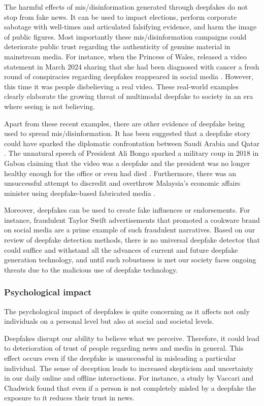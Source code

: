 The harmful effects of mis/disinformation generated through deepfakes do not stop from fake news. It can be used to impact elections, perform corporate sabotage with well-times and articulated falsifying evidence, and harm the image of public figures. Most importantly these mis/disinformation campaigns could deteriorate public trust regarding the authenticity of genuine material in mainstream media. For instance, when the Princess of Wales, released a video statement in March 2024 sharing that she had been diagnosed with cancer a fresh round of conspiracies regarding deepfakes reappeared in social media \cite{deepfakewashingtonpost}. However, this time it was people disbelieving a real video. These real-world examples clearly elaborate the growing threat of multimodal deepfake to society in an era where seeing is not believing.

Apart from these recent examples, there are other evidence of deepfake being used to spread mis/disinformation. It has been suggested that a deepfake story could have sparked the diplomatic confrontation between Saudi Arabia and Qatar \cite{deepfakebrookings1}. The unnatural speech of President Ali Bongo sparked a military coup in 2018 in Gabon claiming that the video was a deepfake and the president was no longer healthy enough for the office or even had died \cite{deepfakeforbes}. Furthermore, there was an unsuccessful attempt to discredit and overthrow Malaysia’s economic affairs minister using deepfake-based fabricated media \cite{deepfakewii}. 

Moreover, deepfakes can be used to create fake influences or endorsements. For instance, fraudulent Taylor Swift advertisements that promoted a cookware brand on social media are a prime example of such fraudulent narratives. Based on our review of deepfake detection methods, there is no universal deepfake detector that could suffice and withstand all the advances of current and future deepfake generation technology, and until such robustness is met our society faces ongoing threats due to the malicious use of deepfake technology. 


\subsubsection{Psychological impact}
The psychological impact of deepfakes is quite concerning as it affects not only individuals on a personal level but also at social and societal levels. 

Deepfakes disrupt our ability to believe what we perceive. Therefore, it could lead to deterioration of trust of people regarding news and media in general. This effect occurs even if the deepfake is unsuccessful in misleading a particular individual. The sense of deception leads to increased skepticism and uncertainty in our daily online and offline interactions. For instance, a study by Vaccari and Chadwick \cite{vaccari2020deepfakes} found that even if a person is not completely misled by a deepfake the exposure to it reduces their trust in news.


